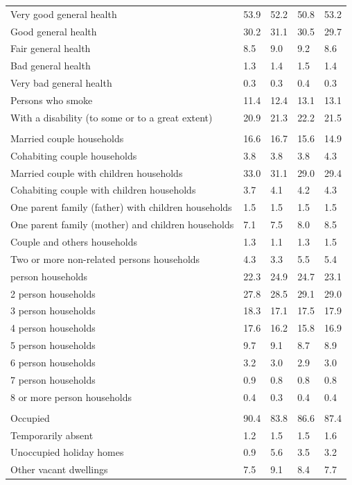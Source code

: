 \documentclass{article}
\begin{document}
\begin{table}[h]
\begin{tabular}{KTTTT}
    \hline
Very good general health & 53.9& 52.2&50.8& 53.2\\
Good general health & 30.2& 31.1& 30.5& 29.7\\
Fair general health & 8.5& 9.0&9.2& 8.6\\
Bad general health & 1.3& 1.4&1.5& 1.4\\
Very bad general health & 0.3& 0.3&0.4& 0.3\\
    \hline
Persons who smoke & 11.4& 12.4&13.1& 13.1\\
    \hline
With a disability (to some or to a great extent) & 20.9& 21.3&22.2& 21.5\\
\hline
    \\ 
    \hline
Married couple households & 16.6& 16.7& 15.6& 14.9\\
Cohabiting couple households & 3.8& 3.8& 3.8& 4.3\\
Married couple with children households & 33.0& 31.1& 29.0& 29.4\\
Cohabiting couple with children households & 3.7& 4.1& 4.2& 4.3\\
One parent family (father) with  children households & 1.5& 1.5& 1.5& 1.5\\
One parent family (mother) and children households & 7.1& 7.5& 8.0& 8.5\\
Couple and others households  & 1.3& 1.1& 1.3& 1.5\\
Two or more non-related persons households & 4.3& 3.3& 5.5& 5.4\\
     person households & 22.3& 24.9& 24.7& 23.1\\
2 person households & 27.8& 28.5& 29.1& 29.0\\
3 person households & 18.3& 17.1& 17.5& 17.9\\
4 person households & 17.6& 16.2& 15.8& 16.9\\
5 person households & 9.7& 9.1& 8.7& 8.9\\
6 person households & 3.2& 3.0& 2.9& 3.0\\
7 person households & 0.9& 0.8& 0.8& 0.8\\
8 or more person households & 0.4& 0.3& 0.4& 0.4\\
\hline
    \\ 
    \hline
Occupied & 90.4& 83.8& 86.6& 87.4\\
Temporarily absent & 1.2& 1.5& 1.5& 1.6\\
Unoccupied holiday homes & 0.9& 5.6& 3.5& 3.2\\
Other vacant dwellings & 7.5& 9.1& 8.4& 7.7\\
\hline
\end{tabular}
\end{table}
\end{document}
